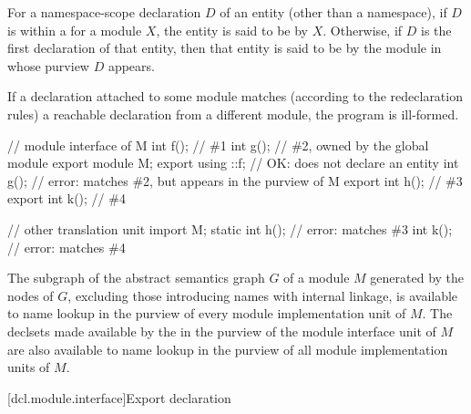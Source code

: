 \begin{std.txt}
  \alinea
For a namespace-scope declaration $D$ of an entity (other than a
namespace), if $D$ is within a 
for a module $X$, the entity is said to be  by $X$.
Otherwise, if $D$ is the first declaration of that entity, then that entity is said
to be  by the module in whose purview $D$ appears. 

  \alinea
  If a declaration attached to some module
  matches (according to the redeclaration rules) a reachable declaration
  from a different module, 
  the program is ill-formed.
  \begin{example}
    \begin{codeblock}
      // module interface of M
      int f();            // \#1
      int g();            // \#2, owned by the global module
      export module M;
      export using ::f;   // OK: does not declare an entity
      int g();            // error: matches \#2, but appears in the purview of M
      export int h();     // \#3
      export int k();     // \#4

      // other translation unit
      import M;
      static int h();     // error: matches \#3
      int k();            // error: matches \#4
    \end{codeblock}
  \end{example}

  \alinea
  The subgraph of the abstract semantics graph $G$ of a module $M$
  generated by the nodes of $G$, excluding those introducing names
  with internal linkage, is available to name lookup in the purview of every
  module implementation unit of $M$.
  The declsets made available by the 
   in the purview of the module
  interface unit of $M$ are also available to name lookup in the purview of all 
  module implementation units of $M$.
\end{std.txt}

[dcl.module.interface]{Export declaration}%

